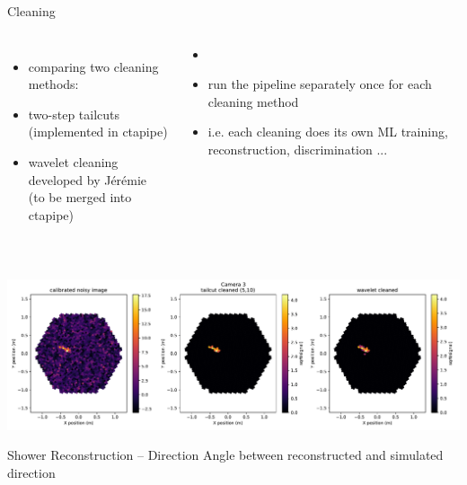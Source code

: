 \documentclass[8pt]{beamer}
\begin{document}
    \begin{frame}{Cleaning}
        \ \\
        \vfill
        \begin{columns}
                \begin{itemize}
                    \item[] comparing two cleaning methods:
                    \item two-step tailcuts (implemented in ctapipe)
                    \item wavelet cleaning developed by Jérémie\\
                        (to be merged into ctapipe)\\\ %
                \end{itemize}
                \begin{itemize}
                    \item[]
                    \item run the pipeline separately once for each cleaning method
                    \item i.e. each cleaning does its own ML training, reconstruction,
                        discrimination ...
                \end{itemize}
        \end{columns}
        \vfill
        \includegraphics[width=\textwidth]{pics/camera_display_cleaning}
    \end{frame}



    \begin{frame}{Shower Reconstruction -- Direction}
            {Angle between reconstructed and simulated direction}
        \setlength{\figureheight}{4.5cm}
        \setlength{\figurewidth}{10cm}
        \centering
        
    \end{frame}
\end{document}
